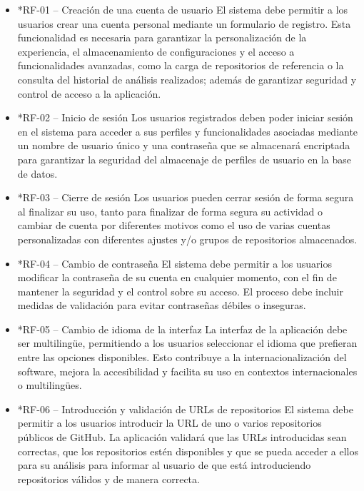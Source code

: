 \begin{itemize}

    \item *{RF-01 – Creación de una cuenta de usuario}
    El sistema debe permitir a los usuarios crear una cuenta personal mediante un formulario de registro. Esta funcionalidad es necesaria para garantizar la personalización de la experiencia, el almacenamiento de configuraciones y el acceso a funcionalidades avanzadas, como la carga de repositorios de referencia o la consulta del historial de análisis realizados; además de garantizar seguridad y control de acceso a la aplicación.
    
    \item*{RF-02 – Inicio  de sesión}
    Los usuarios registrados deben poder iniciar sesión en el sistema para acceder a sus perfiles y funcionalidades asociadas mediante un nombre de usuario único y una contraseña que se almacenará encriptada para garantizar la seguridad del almacenaje de perfiles de usuario en la base de datos.
    
    \item*{RF-03 – Cierre de sesión}
    Los usuarios pueden cerrar sesión de forma segura al finalizar su uso, tanto para finalizar de forma segura su actividad o cambiar de cuenta por diferentes motivos como el uso de varias cuentas personalizadas con diferentes ajustes y/o grupos de repositorios almacenados.
    
    \item*{RF-04 – Cambio de contraseña}
    El sistema debe permitir a los usuarios modificar la contraseña de su cuenta en cualquier momento, con el fin de mantener la seguridad y el control sobre su acceso. El proceso debe incluir medidas de validación para evitar contraseñas débiles o inseguras.
    
    \item*{RF-05 – Cambio de idioma de la interfaz}
    La interfaz de la aplicación debe ser multilingüe, permitiendo a los usuarios seleccionar el idioma que prefieran entre las opciones disponibles. Esto contribuye a la internacionalización del software, mejora la accesibilidad y facilita su uso en contextos internacionales o multilingües.
    
    \item*{RF-06 – Introducción y validación de URLs de repositorios}
    El sistema debe permitir a los usuarios introducir la URL de uno o varios repositorios públicos de GitHub. La aplicación validará que las URLs introducidas sean correctas, que los repositorios estén disponibles y que se pueda acceder a ellos para su análisis para informar al usuario de que está introduciendo repositorios válidos y de manera correcta.
    

\end{itemize}
